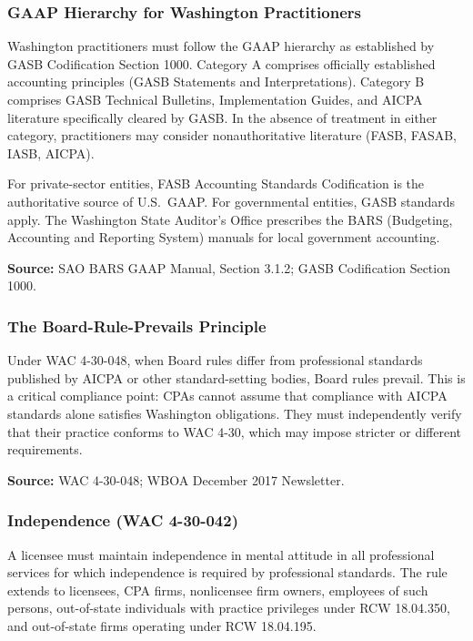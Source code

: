 \documentclass[11pt,letterpaper]{article}
\begin{document}
\subsubsection{GAAP Hierarchy for Washington Practitioners}

Washington practitioners must follow the GAAP hierarchy as established by GASB Codification Section 1000. Category A comprises officially established accounting principles (GASB Statements and Interpretations). Category B comprises GASB Technical Bulletins, Implementation Guides, and AICPA literature specifically cleared by GASB. In the absence of treatment in either category, practitioners may consider nonauthoritative literature (FASB, FASAB, IASB, AICPA).

For private-sector entities, FASB Accounting Standards Codification is the authoritative source of U.S.\ GAAP. For governmental entities, GASB standards apply. The Washington State Auditor's Office prescribes the BARS (Budgeting, Accounting and Reporting System) manuals for local government accounting.

\textbf{Source:} SAO BARS GAAP Manual, Section 3.1.2; GASB Codification Section 1000.

\subsubsection{The Board-Rule-Prevails Principle}

Under WAC 4-30-048, when Board rules differ from professional standards published by AICPA or other standard-setting bodies, Board rules prevail. This is a critical compliance point: CPAs cannot assume that compliance with AICPA standards alone satisfies Washington obligations. They must independently verify that their practice conforms to WAC 4-30, which may impose stricter or different requirements.

\textbf{Source:} WAC 4-30-048; WBOA December 2017 Newsletter.

\subsubsection{Independence (WAC 4-30-042)}

A licensee must maintain independence in mental attitude in all professional services for which independence is required by professional standards. The rule extends to licensees, CPA firms, nonlicensee firm owners, employees of such persons, out-of-state individuals with practice privileges under RCW 18.04.350, and out-of-state firms operating under RCW 18.04.195.
\end{document}
